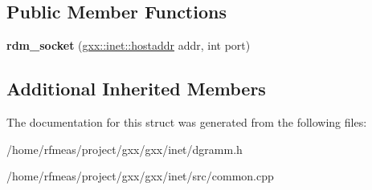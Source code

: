 \subsection*{Public Member Functions}
\begin{DoxyCompactItemize}
\item 
{\bfseries rdm\+\_\+socket} (\hyperlink{classgxx_1_1hostaddr}{gxx\+::inet\+::hostaddr} addr, int port)\hypertarget{structgxx_1_1inet_1_1rdm__socket_a98f6c247d8299373d59d55496e1240e5}{}\label{structgxx_1_1inet_1_1rdm__socket_a98f6c247d8299373d59d55496e1240e5}

\end{DoxyCompactItemize}
\subsection*{Additional Inherited Members}


The documentation for this struct was generated from the following files\+:\begin{DoxyCompactItemize}
\item 
/home/rfmeas/project/gxx/gxx/inet/dgramm.\+h\item 
/home/rfmeas/project/gxx/gxx/inet/src/common.\+cpp\end{DoxyCompactItemize}
